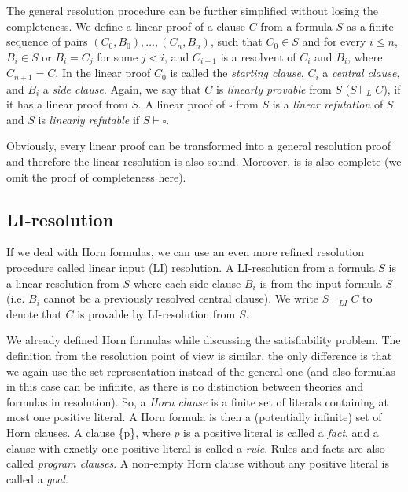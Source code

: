 The general resolution procedure can be further simplified without losing the completeness. We define a linear proof of a clause $C$ from a formula $S$ as a finite sequence of pairs $(C_0, B_0), \dots, (C_n, B_n)$, such that $C_0 \in S$ and for every $i \leq n$, $B_i \in S$ or $B_i = C_j$ for some $j < i$, and $C_{i+1}$ is a resolvent of $C_i$ and $B_i$, where $C_{n+1} = C$. In the linear proof $C_0$ is called the \emph{starting clause}, $C_i$ a \emph{central clause}, and $B_i$ a \emph{side clause}. Again, we say that $C$ is \emph{linearly provable} from $S$ ($S \vdash_L C$), if it has a linear proof from $S$. A linear proof of $\square$ from $S$ is a \emph{linear refutation} of $S$ and $S$ is \emph{linearly refutable} if $S \vdash \square$.

Obviously, every linear proof can be transformed into a general resolution proof and therefore the linear resolution is also sound. Moreover, is is also complete (we omit the proof of completeness here).


\subsection{LI-resolution}

If we deal with Horn formulas, we can use an even more refined resolution procedure called linear input (LI) resolution. A LI-resolution from a formula $S$ is a linear resolution from $S$ where each side clause $B_i$ is from the input formula $S$ (i.e. $B_i$ cannot be a previously resolved central clause). We write $S \vdash_{LI} C$ to denote that $C$ is provable by LI-resolution from $S$.

We already defined Horn formulas while discussing the satisfiability problem. The definition from the resolution point of view is similar, the only difference is that we again use the set representation instead of the general one (and also formulas in this case can be infinite, as there is no distinction between theories and formulas in resolution). So, a \emph{Horn clause} is a finite set of literals containing at most one positive literal. A Horn formula is then a (potentially infinite) set of Horn clauses. A clause \{p\}, where $p$ is a positive literal is called a \emph{fact}, and a clause with exactly one positive literal is called a \emph{rule}. Rules and facts are also called \emph{program clauses}. A non-empty Horn clause without any positive literal is called a \emph{goal}.

